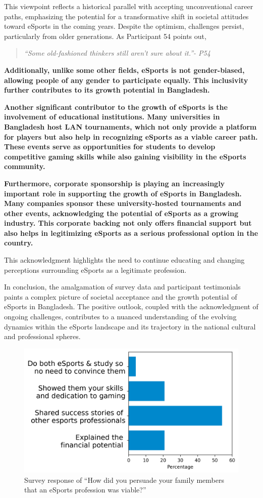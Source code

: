 \documentclass[manuscript,screen,review,anonymous]{acmart}
\begin{document}
This viewpoint reflects a historical parallel with accepting unconventional career paths, emphasizing the potential for a transformative shift in societal attitudes toward eSports in the coming years. Despite the optimism, challenges persist, particularly from older generations. As Participant 54 points out,

\begin{quote}
{\emph{``Some old-fashioned thinkers still aren't sure about it.''- P54}}
\end{quote}

\textbf{Additionally, unlike some other fields, eSports is not gender-biased, allowing people of any gender to participate equally. This inclusivity further contributes to its growth potential in Bangladesh.}

\textbf{Another significant contributor to the growth of eSports is the involvement of educational institutions. Many universities in Bangladesh host LAN tournaments, which not only provide a platform for players but also help in recognizing eSports as a viable career path. These events serve as opportunities for students to develop competitive gaming skills while also gaining visibility in the eSports community.}

\textbf{Furthermore, corporate sponsorship is playing an increasingly important role in supporting the growth of eSports in Bangladesh. Many companies sponsor these university-hosted tournaments and other events, acknowledging the potential of eSports as a growing industry. This corporate backing not only offers financial support but also helps in legitimizing eSports as a serious professional option in the country.}

This acknowledgment highlights the need to continue educating and changing perceptions surrounding eSports as a legitimate profession. 

In conclusion, the amalgamation of survey data and participant testimonials paints a complex picture of societal acceptance and the growth potential of eSports in Bangladesh. The positive outlook, coupled with the acknowledgment of ongoing challenges, contributes to a nuanced understanding of the evolving dynamics within the eSports landscape and its trajectory in the national cultural and professional spheres.

\begin{figure}[h]
  \centering
  \includegraphics[width=0.4\columnwidth]{EA3.png}
  \caption{Survey response of ``How did you persuade your family members that an eSports profession was viable?''}
  \label{fig:againsteSports}
\end{figure}
\end{document}

